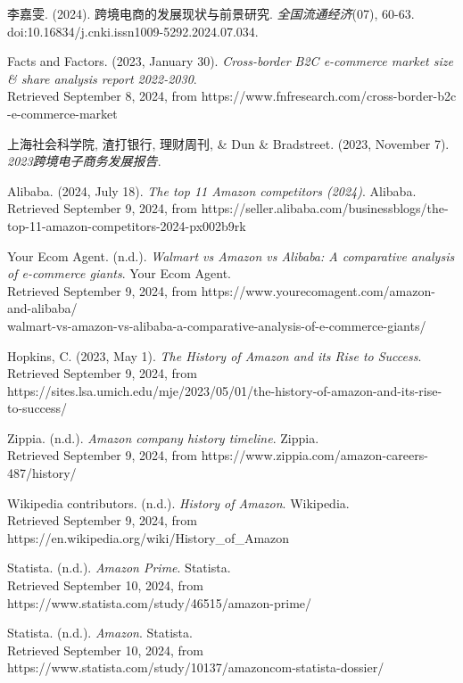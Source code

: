 \documentclass[12pt]{ctexart}
\begin{document}
\begin{thebibliography}{99}
     李嘉雯. (2024). 跨境电商的发展现状与前景研究. \textit{全国流通经济}(07), 60-63. \\ doi:10.16834/j.cnki.issn1009-5292.2024.07.034.

      Facts and Factors. (2023, January 30). \textit{Cross-border B2C e-commerce market size \& share analysis report 2022-2030}. \\ Retrieved September 8, 2024, from https://www.fnfresearch.com/cross-border-b2c  \\  -e-commerce-market

     上海社会科学院, 渣打银行, 理财周刊, \& Dun \& Bradstreet. (2023, November 7). \textit{2023跨境电子商务发展报告}.

     Alibaba. (2024, July 18). \textit{The top 11 Amazon competitors (2024)}. Alibaba. \\ Retrieved September 9, 2024, from https://seller.alibaba.com/businessblogs/the-top-11-amazon-competitors-2024-px002b9rk

     Your Ecom Agent. (n.d.). \textit{Walmart vs Amazon vs Alibaba: A comparative analysis of e-commerce giants}. Your Ecom Agent. \\ Retrieved September 9, 2024, from https://www.yourecomagent.com/amazon-and-alibaba/ \\ walmart-vs-amazon-vs-alibaba-a-comparative-analysis-of-e-commerce-giants/

     Hopkins, C. (2023, May 1). \textit{The History of Amazon and its Rise to Success}. \\ Retrieved September 9, 2024, from https://sites.lsa.umich.edu/mje/2023/05/01/the-history-of-amazon-and-its-rise-to-success/

     Zippia. (n.d.). \textit{Amazon company history timeline}. Zippia. \\ Retrieved September 9, 2024, from https://www.zippia.com/amazon-careers-487/history/
    
     Wikipedia contributors. (n.d.). \textit{History of Amazon}. Wikipedia. \\ Retrieved September 9, 2024, from https://en.wikipedia.org/wiki/History\_of\_Amazon

     Statista. (n.d.). \textit{Amazon Prime}. Statista.\\ Retrieved September 10, 2024, from https://www.statista.com/study/46515/amazon-prime/

     Statista. (n.d.). \textit{Amazon}. Statista. \\ Retrieved September 10, 2024, from https://www.statista.com/study/10137/amazoncom-statista-dossier/


\end{thebibliography}
\end{document}
